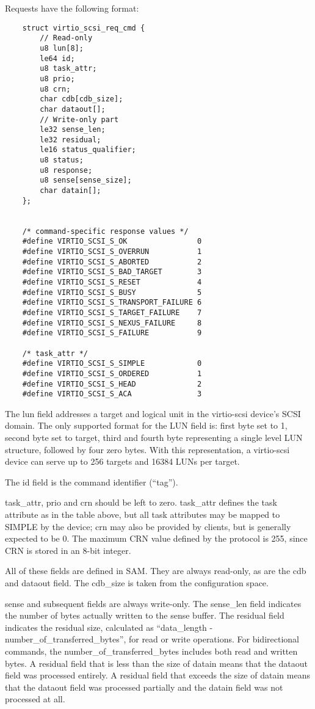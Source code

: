 Requests have the following format:

\begin{lstlisting}
	struct virtio_scsi_req_cmd {
		// Read-only
		u8 lun[8];
		le64 id;
		u8 task_attr;
		u8 prio;
		u8 crn;
		char cdb[cdb_size];
		char dataout[];
		// Write-only part
		le32 sense_len;
		le32 residual;
		le16 status_qualifier;
		u8 status;
		u8 response;
		u8 sense[sense_size];
		char datain[];
	};


	/* command-specific response values */
	#define VIRTIO_SCSI_S_OK                0
	#define VIRTIO_SCSI_S_OVERRUN           1
	#define VIRTIO_SCSI_S_ABORTED           2
	#define VIRTIO_SCSI_S_BAD_TARGET        3
	#define VIRTIO_SCSI_S_RESET             4
	#define VIRTIO_SCSI_S_BUSY              5
	#define VIRTIO_SCSI_S_TRANSPORT_FAILURE 6
	#define VIRTIO_SCSI_S_TARGET_FAILURE    7
	#define VIRTIO_SCSI_S_NEXUS_FAILURE     8
	#define VIRTIO_SCSI_S_FAILURE           9

	/* task_attr */
	#define VIRTIO_SCSI_S_SIMPLE            0
	#define VIRTIO_SCSI_S_ORDERED           1
	#define VIRTIO_SCSI_S_HEAD              2
	#define VIRTIO_SCSI_S_ACA               3
\end{lstlisting}

The lun field addresses a target and logical unit in the
virtio-scsi device's SCSI domain. The only supported format for
the LUN field is: first byte set to 1, second byte set to target,
third and fourth byte representing a single level LUN structure,
followed by four zero bytes. With this representation, a
virtio-scsi device can serve up to 256 targets and 16384 LUNs per
target.

The id field is the command identifier (“tag”).

task_attr, prio and crn should be left to zero. task_attr defines
the task attribute as in the table above, but all task attributes
may be mapped to SIMPLE by the device; crn may also be provided
by clients, but is generally expected to be 0. The maximum CRN
value defined by the protocol is 255, since CRN is stored in an
8-bit integer.

All of these fields are defined in SAM. They are always
read-only, as are the cdb and dataout field. The cdb_size is
taken from the configuration space.

sense and subsequent fields are always write-only. The sense_len
field indicates the number of bytes actually written to the sense
buffer. The residual field indicates the residual size,
calculated as “data_length - number_of_transferred_bytes”, for
read or write operations. For bidirectional commands, the
number_of_transferred_bytes includes both read and written bytes.
A residual field that is less than the size of datain means that
the dataout field was processed entirely. A residual field that
exceeds the size of datain means that the dataout field was
processed partially and the datain field was not processed at
all.

